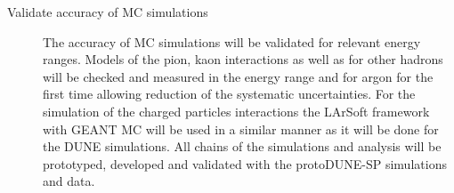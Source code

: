 \begin{description}
\item [Validate accuracy of MC simulations] 

The accuracy of MC simulations will be validated for relevant energy ranges. Models of the pion, kaon interactions as well as for other hadrons will be checked and measured in the energy range and for argon for the first time allowing reduction of the systematic uncertainties. For the simulation of the charged particles interactions the LArSoft framework with GEANT MC will be used in a similar manner as it will be done for the DUNE simulations. All chains of the simulations and analysis will be prototyped, developed and validated with the protoDUNE-SP simulations and data. 

\end{description}


